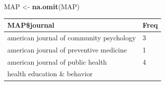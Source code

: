 \documentclass[]{tufte-handout}
\newenvironment{Shaded}{}{}
\newcommand{\KeywordTok}[1]{\textbf{{#1}}}
\newcommand{\StringTok}[1]{{#1}}
\newcommand{\NormalTok}[1]{{#1}}
\begin{document}
\begin{Shaded}
\begin{Highlighting}[]
\NormalTok{MAP <-}\StringTok{ }\KeywordTok{na.omit}\NormalTok{(MAP)}
\end{Highlighting}
\end{Shaded}

\begin{Shaded}
\end{Shaded}

\begin{longtable}[]{@{}ll@{}}
\toprule
\begin{minipage}[b]{0.67\columnwidth}\raggedright\strut
MAP\$journal\strut
\end{minipage} & \begin{minipage}[b]{0.08\columnwidth}\raggedright\strut
Freq\strut
\end{minipage}\tabularnewline
\midrule
\endhead
\begin{minipage}[t]{0.67\columnwidth}\raggedright\strut
american journal of community psychology\strut
\end{minipage} & \begin{minipage}[t]{0.08\columnwidth}\raggedright\strut
3\strut
\end{minipage}\tabularnewline
\begin{minipage}[t]{0.67\columnwidth}\raggedright\strut
american journal of preventive medicine\strut
\end{minipage} & \begin{minipage}[t]{0.08\columnwidth}\raggedright\strut
1\strut
\end{minipage}\tabularnewline
\begin{minipage}[t]{0.67\columnwidth}\raggedright\strut
american journal of public health\strut
\end{minipage} & \begin{minipage}[t]{0.08\columnwidth}\raggedright\strut
4\strut
\end{minipage}\tabularnewline
\begin{minipage}[t]{0.67\columnwidth}\raggedright\strut
health education \& behavior\strut
\end{minipage} & \begin{minipage}[t]{0.08\columnwidth}\raggedright\strut

\end{minipage}
\end{longtable}
\end{document}

